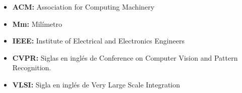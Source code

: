 \begin{itemize}


\item \textbf{ACM:} Association for Computing Machinery

\item \textbf{Mm:} Milímetro %

\item \textbf{IEEE:} Institute of Electrical and Electronics Engineers %

\item \textbf{CVPR:} Siglas en inglés de Conference on Computer Vision and Pattern Recognition.

\item \textbf{VLSI:} Sigla en inglés de Very Large Scale Integration

\end{itemize}